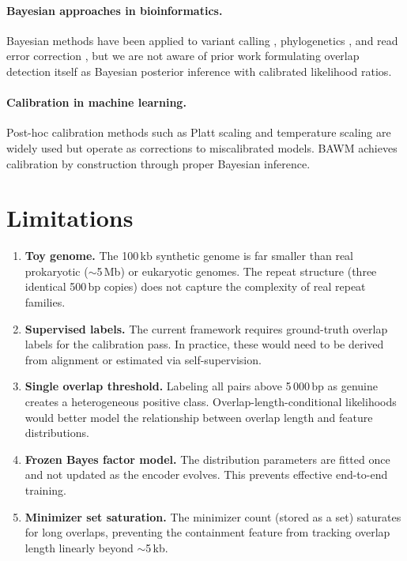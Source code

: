 \documentclass[11pt,a4paper]{article}
\begin{document}
\paragraph{Bayesian approaches in bioinformatics.}
Bayesian methods have been applied to variant calling
\citep{garrison2012haplotype}, phylogenetics \citep{ronquist2003mrbayes},
and read error correction \citep{greenfield2014bayeshammer}, but we
are not aware of prior work formulating overlap detection itself as
Bayesian posterior inference with calibrated likelihood ratios.

\paragraph{Calibration in machine learning.}
Post-hoc calibration methods such as Platt scaling
\citep{platt1999probabilistic} and temperature scaling
\citep{guo2017calibration} are widely used but operate as
corrections to miscalibrated models.  BAWM achieves calibration by
construction through proper Bayesian inference.


\section{Limitations}
\label{sec:limitations}

\begin{enumerate}
  \item \textbf{Toy genome.} The 100\,kb synthetic genome is far
    smaller than real prokaryotic ($\sim$5\,Mb) or eukaryotic genomes.
    The repeat structure (three identical 500\,bp copies) does not
    capture the complexity of real repeat families.

  \item \textbf{Supervised labels.} The current framework requires
    ground-truth overlap labels for the calibration pass.  In practice,
    these would need to be derived from alignment or estimated via
    self-supervision.

  \item \textbf{Single overlap threshold.} Labeling all pairs above
    5\,000\,bp as genuine creates a heterogeneous positive class.
    Overlap-length-conditional likelihoods would better model the
    relationship between overlap length and feature distributions.

  \item \textbf{Frozen Bayes factor model.} The distribution
    parameters are fitted once and not updated as the encoder evolves.
    This prevents effective end-to-end training.

  \item \textbf{Minimizer set saturation.} The minimizer count
    (stored as a set) saturates for long overlaps, preventing the
    containment feature from tracking overlap length linearly beyond
    $\sim$5\,kb.
\end{enumerate}
\end{document}
